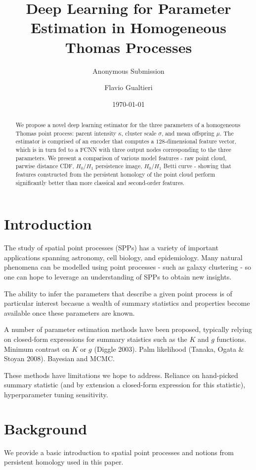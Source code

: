 \documentclass[letterpaper]{article}
\title{Deep Learning for Parameter Estimation in Homogeneous Thomas Processes}
\author{Anonymous Submission}
\author{Flavio Gualtieri}
\date{\today}
\newcommand{\1}{\mathds{1}}
\newcommand{\kpar}{\kappa}
\newcommand{\cs}{\sigma}
\newcommand{\mo}{\mu}
\theoremstyle{plain}
\theoremstyle{definition}
\theoremstyle{remark}
\begin{document}
\maketitle

\begin{abstract}
We propose a novel deep learning estimator for the three parameters of a homogeneous Thomas point process: parent intensity $\kpar$, cluster scale $\cs$, and mean offspring $\mo$. The estimator is comprised of an encoder that computes a $128$-dimensional feature vector, which is in turn fed to a FCNN with three output nodes corresponding to the three parameters. We present a comparison of various model features - raw point cloud, parwise distance CDF, $H_0$/$H_1$ persistence image, $H_0$/$H_1$ Betti curve - showing that features constructed from the persistent homology of the point cloud perform significantly better than more classical and second-order features.
\end{abstract}


\section{Introduction}
The study of spatial point processes (SPPs) has a variety of important applications spanning astronomy, cell biology, and epidemiology. Many natural phenomena can be modelled using point processes - such as galaxy clustering - so one can hope to leverage an understanding of SPPs to obtain new insights.

The ability to infer the parameters that describe a given point process is of particular interest becasue a wealth of summary statistics and properties become available once these parameters are known.

A number of parameter estimation methods have been proposed, typically relying on closed-form expressions for summary staistics such as the $K$ and $g$ functions. Minimum contrast on $K$ or $g$ (Diggle 2003). Palm likelihood (Tanaka, Ogata \& Stoyan 2008). Bayesian and MCMC.

These methods have limitations we hope to address. Reliance on hand-picked summary statistic (and by extension a closed-form expression for this statistic), hyperparameter tuning sensitivity.


\section{Background}
We provide a basic introduction to spatial point processes and notions from persistent homology used in this paper.
\end{document}
